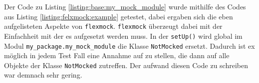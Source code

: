 Der Code zu Listing \ref{listing:base:my_mock_module} wurde mithilfe des Codes aus Listing
\ref{listing:felxmock:example} getestet, dabei ergaben sich die eben aufgelisteten Aspekte von 
\lstinline{flexmock}. \lstinline{flexmock} überzeugt dabei mit der Einfachheit
mit der es aufgesetzt werden muss. In der \lstinline{setUp()} wird global im Modul
\lstinline{my_package.my_mock_module} die Klasse \lstinline{NotMocked} ersetzt. Dadurch ist
ex möglich in jedem Test Fall eine Annahme auf zu stellen, die dann auf alle Objekte
der Klasse \lstinline{NotMocked} zutreffen. Der aufwand diesen Code zu schreiben war demnach
sehr gering.
